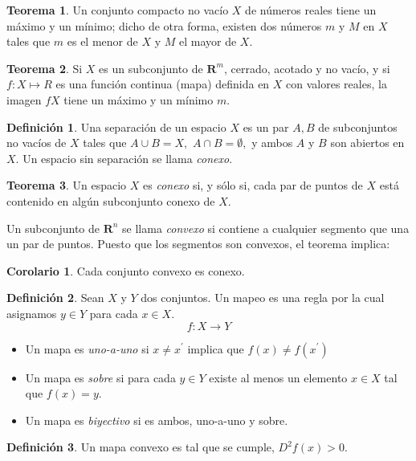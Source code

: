 \documentclass{article}
\theoremstyle{definition} \newtheorem{defi}{Definici\'on}
\theoremstyle{definition} \newtheorem{teo}{Teorema}
\theoremstyle{definition} \newtheorem{cor}{Corolario}
\begin{document}
\begin{teo}
Un conjunto compacto no vac\'io $X$ de n\'umeros reales tiene un m\'aximo y un m\'inimo; dicho de otra forma, existen dos n\'umeros $m$ y $M$ en $X$ tales que $m$ es el menor de $X$ y $M$ el mayor de $X$.
\end{teo}

\begin{teo}
Si $X$ es un subconjunto de $\mathbf{R}^m$, cerrado, acotado y no vac\'io, y si $f:X \longmapsto R$ es una funci\'on continua (mapa) definida en $X$ con valores reales, la imagen $fX$ tiene un m\'aximo y un m\'inimo $m$. 
\end{teo}

\begin{defi}
Una separaci\'on de un espacio $X$ es un par $A,B$ de subconjuntos no vac\'ios de $X$ tales que $A \cup B = X,$ $A \cap B = \emptyset,$ y ambos $A$ y $B$ son abiertos en $X$. Un espacio sin separaci\'on se llama \emph{conexo}.
\end{defi}

\begin{teo}
Un espacio $X$ es \emph{conexo} si, y s\'olo si, cada par de puntos de $X$ est\'a contenido en alg\'un subconjunto conexo de $X$.
\end{teo}

Un subconjunto de $\mathbf{R}^n$ se llama \emph{convexo} si contiene a cualquier segmento que una un par de puntos. Puesto que los segmentos son convexos, el teorema implica:

\begin{cor}
Cada conjunto convexo es conexo.
\end{cor}

\begin{defi}
Sean $X$ y $Y$ dos conjuntos. Un mapeo es una regla por la cual asignamos $y \in Y$ para cada $x \in X$.
$$f:X \rightarrow Y$$
\begin{itemize}
\item Un mapa es \emph{uno-a-uno} si $x \neq x^{'}$ implica que $f(x) \neq f(x^{'})$
\item Un mapa es \emph{sobre} si para cada $y \in Y$ existe al menos un elemento $x \in X$ tal que $f(x)=y$.
\item Un mapa es \emph{biyectivo} si es ambos, uno-a-uno y sobre.
\end{itemize}
\end{defi}

\begin{defi}
Un {mapa convexo} es tal que se cumple, $D^2f(x)>0.$
\end{defi}
\end{document}
